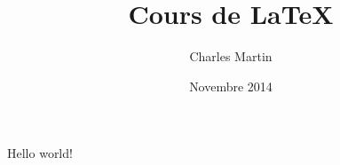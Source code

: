 \documentclass{article}
\title{Cours de LaTeX}
\author{Charles Martin}
\date{Novembre 2014}
\begin{document}
   \maketitle
   Hello world!
\end{document}
